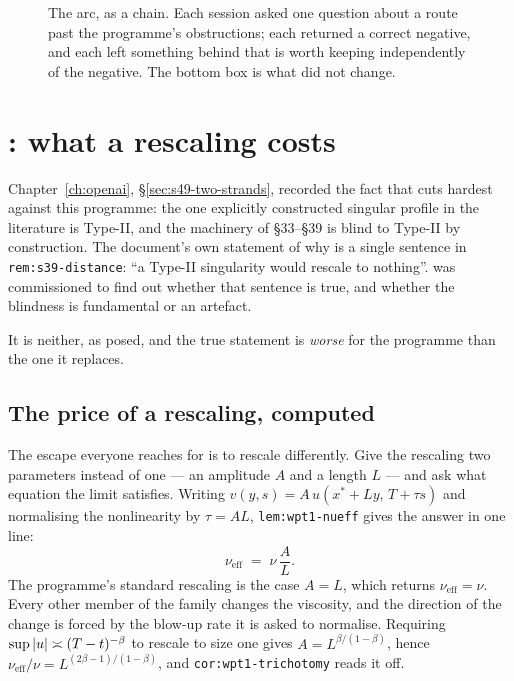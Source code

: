 \begin{figure}[ht]
\caption[The five-session arc]{The arc, as a chain. Each session asked one
question about a route past the programme's obstructions; each returned a
correct negative, and each left something behind that is worth keeping
independently of the negative. The bottom box is what did not change.}
\label{fig:pt-arc}
\end{figure}

\section{\texorpdfstring{: what a rescaling costs}{S53: what a rescaling costs}}
\label{sec:pt-s53}

Chapter~\ref{ch:openai}, \S\ref{sec:s49-two-strands}, recorded the fact that
cuts hardest against this programme: the one explicitly constructed singular
profile in the literature is Type-II, and the machinery of \S33--\S39 is blind
to Type-II by construction. The document's own statement of why is a single
sentence in \texttt{rem:s39-distance}: ``a Type-II singularity would rescale to
nothing''.  was commissioned to find out whether that sentence is true,
and whether the blindness is fundamental or an artefact.

It is neither, as posed, and the true statement is \emph{worse} for the
programme than the one it replaces.

\subsection{The price of a rescaling, computed}

The escape everyone reaches for is to rescale differently. Give the rescaling
two parameters instead of one --- an amplitude \(A\) and a length \(L\) --- and
ask what equation the limit satisfies. Writing
\(v(y,s)=A\,u(x^*+Ly,\,T+\tau s)\) and normalising the nonlinearity by
\(\tau=AL\), \texttt{lem:wpt1-nueff} gives the answer in one line:
\[
  \nu_{\mathrm{eff}} \;=\; \nu\,\frac{A}{L}.
\]
The programme's standard rescaling is the case \(A=L\), which returns
\(\nu_{\mathrm{eff}}=\nu\). Every other member of the family changes the
viscosity, and the direction of the change is forced by the blow-up rate it is
asked to normalise. Requiring \(\sup\left|u\right|\asymp(T-t)^{-\beta}\) to rescale to
size one gives \(A=L^{\beta/(1-\beta)}\), hence
\(\nu_{\mathrm{eff}}/\nu=L^{(2\beta-1)/(1-\beta)}\), and
\texttt{cor:wpt1-trichotomy} reads it off.

